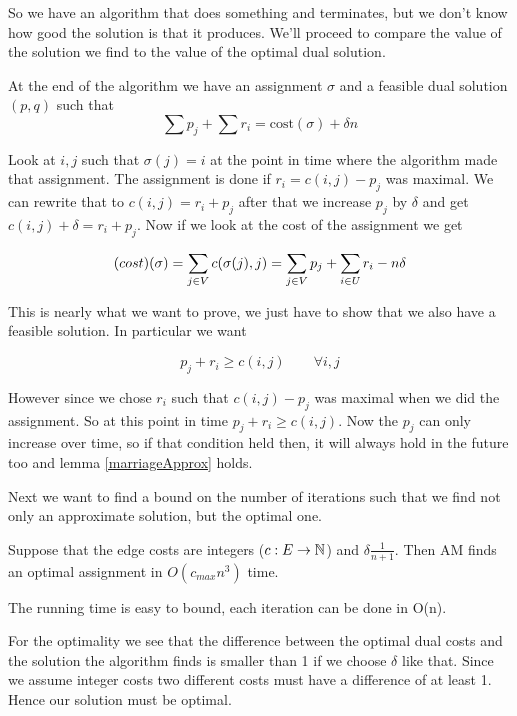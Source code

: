 So we have an algorithm that does something and terminates, but we don't know how good the solution is that it produces. We'll proceed to compare the value of the solution we find to the value of the optimal dual solution.

\begin{lem}\label{marriageApprox} At the end of the algorithm we have an assignment $\sigma$ and a feasible dual solution $(p,q)$ such that
\[\sum p_j + \sum r_i = \text{cost}(\sigma) + \delta n\]
\end{lem}

Look at $i,j$ such that $\sigma(j)=i$ at the point in time where the algorithm made that assignment. The assignment is done if $r_i=c(i,j)-p_j$ was maximal. We can rewrite that to $c(i,j) = r_i+p_j$ after that we increase $p_j$ by $\delta$ and get $c(i,j) +\delta = r_i+p_j$. Now if we look at the cost of the assignment we get

\[\text(cost)(\sigma) = \sum_{j\in V} c(\sigma(j),j) = \sum_{j\in V} p_j + \sum_{i\in U} r_i - n\delta\]

This is nearly what we want to prove, we just have to show that we also have a feasible solution. In particular we want

\[p_j+r_i \geq c(i,j) \qquad \forall i,j\]

However since we chose $r_i$ such that $c(i,j)-p_j$ was maximal when we did the assignment. So at this point in time $p_j + r_i \geq c(i,j)$. Now the $p_j$ can only increase over time, so if that condition held then, it will always hold in the future too and lemma \ref{marriageApprox} holds.

Next we want to find a bound on the number of iterations such that we find not only an approximate solution, but the optimal one.

\begin{thm} Suppose that the edge costs are integers ($c:E\rightarrow \mathbb{N}$) and $\delta \frac{1}{n+1}$. Then AM finds an optimal assignment in $O(c_{max}n^3)$ time.
\end{thm}

\begin{pr} The running time is easy to bound, each iteration can be done in O(n).

For the optimality we see that the difference between the optimal dual costs and the solution the algorithm finds is smaller than 1 if we choose $\delta$ like that. Since we assume integer costs two different costs must have a difference of at least 1. Hence our solution must be optimal.
\end{pr}

